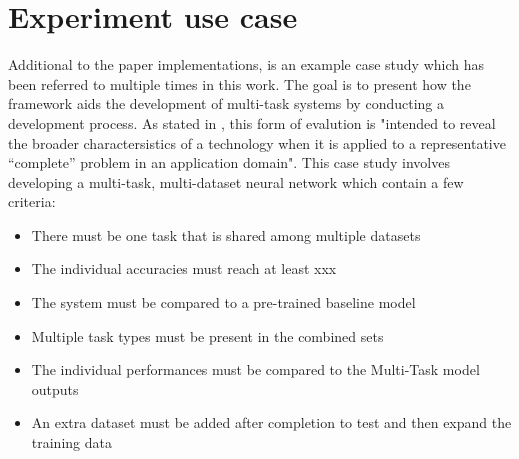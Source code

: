 \section{Experiment use case}

% 




Additional to the paper implementations, is an example case study which has been referred to multiple times in this work. The goal is to present how the framework aids the development of multi-task systems by conducting a development process. As stated in \cite{brown1996framework}, this form of evalution is "intended to reveal the broader charactersistics of a technology when it is applied to a representative “complete” problem in an application domain". This case study involves developing a multi-task, multi-dataset neural network which contain a few criteria: \\

\begin{itemize}
	\item There must be one task that is shared among multiple datasets
	\item The individual accuracies must reach at least xxx
	\item The system must be compared to a pre-trained baseline model
	\item Multiple task types must be present in the combined sets
	\item The individual performances must be compared to the Multi-Task model outputs
	\item An extra dataset must be added after completion to test and then expand the training data
\end{itemize}

